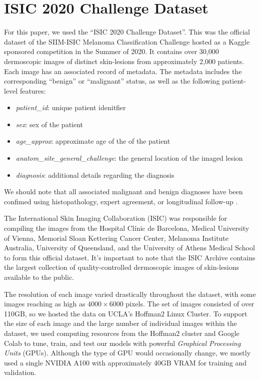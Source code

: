 \documentclass [MAS] {uclathes}
\begin{document}
\section{ISIC 2020 Challenge Dataset}

For this paper, we used the ``ISIC 2020 Challenge Dataset''. This was the official dataset of the SIIM-ISIC Melanoma Classification Challenge hosted as a Kaggle sponsored competition in the Summer of 2020. It contains over 30,000 dermoscopic images of distinct skin-lesions from approximately 2,000 patients. Each image has an associated record of metadata. The metadata includes the corresponding ``benign'' or ``malignant'' status, as well as the following patient-level features: 

\begin{itemize}
    \item \textit{patient\_id}: unique patient idenitfier
    \item \textit{sex}: sex of the patient 
    \item \textit{age\_approx}: approximate age of the of the patient
    \item \textit{anatom\_site\_general\_challenge}: the general location of the imaged lesion
    \item \textit{diagnosis}: additional details regarding the diagnosis
\end{itemize}

We should note that all associated malignant and benign diagnoses have been confimed using histopathology, expert agreement, or longitudinal follow-up \cite{ISIC}.

The International Skin Imaging Collaboration (ISIC) was responsible for compiling the images from the Hospital Clínic de Barcelona, Medical University of Vienna, Memorial Sloan Kettering Cancer Center, Melanoma Institute Australia, University of Queensland, and the University of Athens Medical School to form this official dataset. It's important to note that the ISIC Archive contains the largest collection of quality-controlled dermoscopic images of skin-lesions available to the public. 

The resolution of each image varied drastically throughout the dataset, with some images reaching as high as $4000 \times 6000$ pixels. The set of images consisted of over 110GB, so we hosted the data on UCLA's Hoffman2 Linux Cluster. To support the size of each image and the large number of individual images within the dataset, we used computing resources from the Hoffman2 cluster and Google Colab to tune, train, and test our models with powerful \textit{Graphical Processing Units} (GPUs). Although the type of GPU would occasionally change, we mostly used a single NVIDIA A100 with approximately 40GB VRAM for training and validation.
\end{document}
